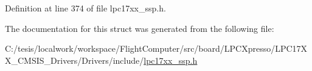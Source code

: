 \-Definition at line 374 of file lpc17xx\-\_\-ssp.\-h.



\-The documentation for this struct was generated from the following file\-:\begin{DoxyCompactItemize}
\item 
\-C\-:/tesis/localwork/workspace/\-Flight\-Computer/src/board/\-L\-P\-C\-Xpresso/\-L\-P\-C17\-X\-X\-\_\-\-C\-M\-S\-I\-S\-\_\-\-Drivers/\-Drivers/include/\hyperlink{lpc17xx__ssp_8h}{lpc17xx\-\_\-ssp.\-h}\end{DoxyCompactItemize}
